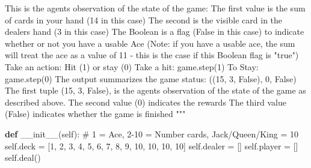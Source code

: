 \documentclass[
  letterpaper,
  DIV=11,
  numbers=noendperiod]{scrartcl}
\newenvironment{Shaded}{\begin{snugshade}}{\end{snugshade}}
\newcommand{\CommentTok}[1]{\textcolor[rgb]{0.37,0.37,0.37}{#1}}
\newcommand{\DecValTok}[1]{\textcolor[rgb]{0.68,0.00,0.00}{#1}}
\newcommand{\FunctionTok}[1]{\textcolor[rgb]{0.28,0.35,0.67}{#1}}
\newcommand{\KeywordTok}[1]{\textcolor[rgb]{0.00,0.23,0.31}{\textbf{#1}}}
\newcommand{\NormalTok}[1]{\textcolor[rgb]{0.00,0.23,0.31}{#1}}
\newcommand{\OperatorTok}[1]{\textcolor[rgb]{0.37,0.37,0.37}{#1}}
\newcommand{\VariableTok}[1]{\textcolor[rgb]{0.07,0.07,0.07}{#1}}
\begin{document}
\begin{Shaded}
\begin{Highlighting}[]
\CommentTok{            This is the agent\textquotesingle{}s observation of the state of the game:}
\CommentTok{            The first value is the sum of cards in your hand (14 in this case)}
\CommentTok{            The second is the visible card in the dealer\textquotesingle{}s hand (3 in this case)}
\CommentTok{            The Boolean is a flag (False in this case) to indicate whether or }
\CommentTok{                not you have a usable Ace}
\CommentTok{            (Note: if you have a usable ace, the sum will treat the ace as a }
\CommentTok{                value of \textquotesingle{}11\textquotesingle{} {-} this is the case if this Boolean flag is "true")}
\CommentTok{            }
\CommentTok{        Take an action: Hit (1) or stay (0)}
\CommentTok{        }
\CommentTok{            Take a hit: game.step(1)}
\CommentTok{            To Stay:    game.step(0)}
\CommentTok{            }
\CommentTok{        The output summarizes the game status:}
\CommentTok{            }
\CommentTok{            ((15, 3, False), 0, False)}
\CommentTok{            }
\CommentTok{            The first tuple (15, 3, False), is the agent\textquotesingle{}s observation of the}
\CommentTok{            state of the game as described above.}
\CommentTok{            The second value (0) indicates the rewards}
\CommentTok{            The third value (False) indicates whether the game is finished}
\CommentTok{    """}
    
    \KeywordTok{def} \FunctionTok{\_\_init\_\_}\NormalTok{(}\VariableTok{self}\NormalTok{):}
        \CommentTok{\# 1 = Ace, 2{-}10 = Number cards, Jack/Queen/King = 10}
        \VariableTok{self}\NormalTok{.deck   }\OperatorTok{=}\NormalTok{ [}\DecValTok{1}\NormalTok{, }\DecValTok{2}\NormalTok{, }\DecValTok{3}\NormalTok{, }\DecValTok{4}\NormalTok{, }\DecValTok{5}\NormalTok{, }\DecValTok{6}\NormalTok{, }\DecValTok{7}\NormalTok{, }\DecValTok{8}\NormalTok{, }\DecValTok{9}\NormalTok{, }\DecValTok{10}\NormalTok{, }\DecValTok{10}\NormalTok{, }\DecValTok{10}\NormalTok{, }\DecValTok{10}\NormalTok{]}
        \VariableTok{self}\NormalTok{.dealer }\OperatorTok{=}\NormalTok{ []}
        \VariableTok{self}\NormalTok{.player }\OperatorTok{=}\NormalTok{ []}
        \VariableTok{self}\NormalTok{.deal()}


\end{Highlighting}
\end{Shaded}
\end{document}
